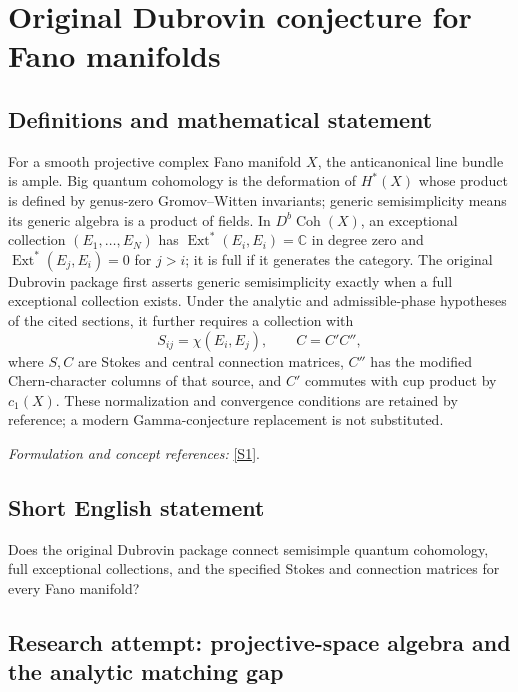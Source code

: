 \documentclass[11pt]{article}
\begin{document}
\section*{\texorpdfstring{Original Dubrovin conjecture for Fano manifolds}{Original Dubrovin conjecture for Fano manifolds}}\label{316}
\subsection{Definitions and mathematical statement}
For a smooth projective complex Fano manifold $X$, the anticanonical line bundle is ample. Big quantum cohomology is the deformation of $H^*(X)$ whose product is defined by genus-zero Gromov--Witten invariants; generic semisimplicity means its generic algebra is a product of fields. In $D^b\operatorname{Coh}(X)$, an exceptional collection $(E_1,\ldots,E_N)$ has $\operatorname{Ext}^*(E_i,E_i)={\mathbb{C}}$ in degree zero and $\operatorname{Ext}^*(E_j,E_i)=0$ for $j>i$; it is full if it generates the category. The original Dubrovin package first asserts generic semisimplicity exactly when a full exceptional collection exists. Under the analytic and admissible-phase hypotheses of the cited sections, it further requires a collection with
\[
 S_{ij}=\chi(E_i,E_j),\qquad C=C'C'',
\]
where $S,C$ are Stokes and central connection matrices, $C''$ has the modified Chern-character columns of that source, and $C'$ commutes with cup product by $c_1(X)$. These normalization and convergence conditions are retained by reference; a modern Gamma-conjecture replacement is not substituted.
\par\smallskip\textit{Formulation and concept references:} \href{https://arxiv.org/pdf/1404.6407v4}{[S1]}.

\subsection{Short English statement}
Does the original Dubrovin package connect semisimple quantum cohomology, full exceptional collections, and the specified Stokes and connection matrices for every Fano manifold?
\subsection{Research attempt: projective-space algebra and the analytic matching gap}
\end{document}
